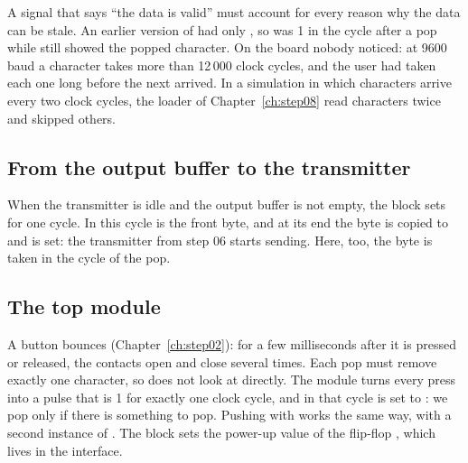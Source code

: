 \begin{pitfall}
A signal that says ``the data is valid'' must account for every reason why
the data can be stale. An earlier version of  had only
, so  was 1 in the cycle after a pop while
 still showed the popped character. On the board nobody
noticed: at 9600 baud a character takes more than 12\,000 clock cycles, and
the user had taken each one long before the next arrived. In a simulation in
which characters arrive every two clock cycles, the loader of
Chapter~\ref{ch:step08} read characters twice and skipped others.
\end{pitfall}

\subsection*{From the output buffer to the transmitter}


When the transmitter is idle and the output buffer is not empty, the block
sets  for one cycle. In this cycle  is the front
byte, and at its end the byte is copied to  and  is
set: the transmitter from step 06 starts sending. Here, too, the byte is
taken in the cycle of the pop.

\subsection*{The top module}


A button bounces (Chapter~\ref{ch:step02}): for a few milliseconds after it is
pressed or released, the contacts open and close several times. Each pop must
remove exactly one character, so  does not look at 
directly. The module  turns every press into a pulse
 that is 1 for exactly one clock cycle, and in that cycle
 is set to : we pop only if there is something to
pop. Pushing with  works the same way, with a second instance of
. The  block sets the power-up value of the
flip-flop , which lives in the interface.


